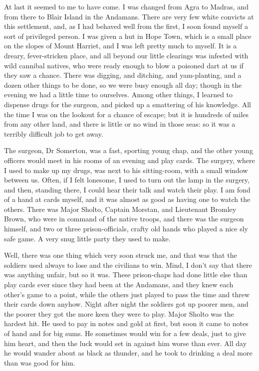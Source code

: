 At last it seemed to me to have come. I was changed from Agra to Madras, and from there to Blair Island in the Andamans. There are very few white convicts at this settlement, and, as I had behaved well from the first, I soon found myself a sort of privileged person. I was given a hut in Hope Town, which is a small place on the slopes of Mount Harriet, and I was left pretty much to myself. It is a dreary, fever-stricken place, and all beyond our little clearings was infested with wild cannibal natives, who were ready enough to blow a poisoned dart at us if they saw a chance. There was digging, and ditching, and yam-planting, and a dozen other things to be done, so we were busy enough all day; though in the evening we had a little time to ourselves. Among other things, I learned to dispense drugs for the surgeon, and picked up a smattering of his knowledge. All the time I was on the lookout for a chance of escape; but it is hundreds of miles from any other land, and there is little or no wind in those seas: so it was a terribly difficult job to get away.

The surgeon, Dr Somerton, was a fast, sporting young chap, and the other young officers would meet in his rooms of an evening and play cards. The surgery, where I used to make up my drugs, was next to his sitting-room, with a small window between us. Often, if I felt lonesome, I used to turn out the lamp in the surgery, and then, standing there, I could hear their talk and watch their play. I am fond of a hand at cards myself, and it was almost as good as having one to watch the others. There was Major Sholto, Captain Morstan, and Lieutenant Bromley Brown, who were in command of the native troops, and there was the surgeon himself, and two or three prison-officials, crafty old hands who played a nice sly safe game. A very snug little party they used to make.

Well, there was one thing which very soon struck me, and that was that the soldiers used always to lose and the civilians to win. Mind, I don't say that there was anything unfair, but so it was. These prison-chaps had done little else than play cards ever since they had been at the Andamans, and they knew each other's game to a point, while the others just played to pass the time and threw their cards down anyhow. Night after night the soldiers got up poorer men, and the poorer they got the more keen they were to play. Major Sholto was the hardest hit. He used to pay in notes and gold at first, but soon it came to notes of hand and for big sums. He sometimes would win for a few deals, just to give him heart, and then the luck would set in against him worse than ever. All day he would wander about as black as thunder, and he took to drinking a deal more than was good for him.

